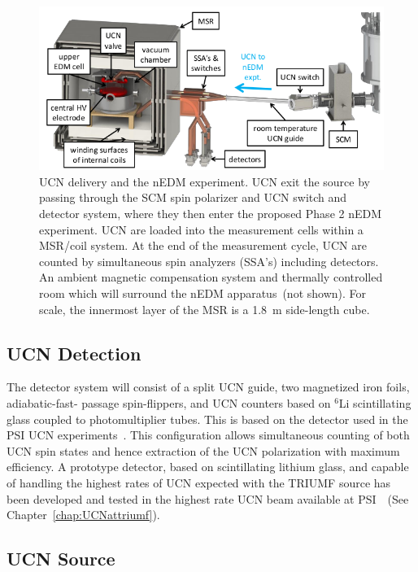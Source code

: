 \begin{figure}[h!]
  \centering
  \includegraphics[width=1.0\textwidth]{UCNdelivery.png}
  \caption{UCN delivery and the nEDM experiment. UCN exit the source
    by passing through the SCM spin polarizer and UCN switch and
    detector system, where they then enter the proposed Phase 2 nEDM
    experiment. UCN are loaded into the measurement cells within a
    MSR/coil system. At the end of the measurement cycle, UCN are
    counted by simultaneous spin analyzers (SSA’s) including
    detectors. An ambient magnetic compensation system and thermally
    controlled room which will surround the nEDM apparatus~(not
    shown). For scale, the innermost layer of the MSR is a 1.8~m
    side-length cube.}
  \label{fig:UCNdelivery}
\end{figure}

\subsection{UCN Detection}
The detector system will consist of a split UCN guide, two magnetized
iron foils, adiabatic-fast- passage spin-flippers, and UCN counters
based on $^6$Li scintillating glass coupled to photomultiplier
tubes. This is based on the detector used in the PSI UCN
experiments~\cite{Ban2009}. This configuration allows simultaneous
counting of both UCN spin states and hence extraction of the UCN
polarization with maximum efficiency. A prototype detector, based on
scintillating lithium glass, and capable of handling the highest rates
of UCN expected with the TRIUMF source has been developed and tested
in the highest rate UCN beam available at
PSI~\cite{jamieson2017characterization}~(See
Chapter~\ref{chap:UCNattriumf}).


\subsection{UCN Source}


